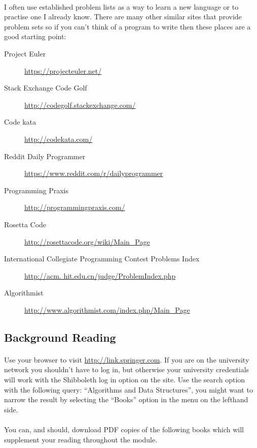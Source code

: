 \documentclass[10pt, a4paper, twosize]{article}
\begin{document}
\paragraph{} I often use established problem lists as a way to learn a new language or to practise one I already know. There are many other similar sites that provide problem sets so if you can't think of a program to write then these places are a good starting point:

\begin{description}
\item[Project Euler]\url{https://projecteuler.net/}
\item[Stack Exchange Code Golf]\url{http://codegolf.stackexchange.com/}
\item[Code kata]\url{http://codekata.com/}
\item[Reddit Daily Programmer]\url{https://www.reddit.com/r/dailyprogrammer}
\item[Programming Praxis]\url{http://programmingpraxis.com/}
\item[Rosetta Code]\url{http://rosettacode.org/wiki/Main_Page}
\item[International Collegiate Programming Contest Problems Index]\url{http://acm. hit.edu.cn/judge/ProblemIndex.php}
\item[Algorithmist]\url{http://www.algorithmist.com/index.php/Main_Page}
\end{description}


\subsection{Background Reading}

\paragraph{} Use your browser to visit \url{http://link.springer.com}. If you are on the university network you shouldn't have to log in, but otherwise your university credentials will work with the Shibboleth log in option on the site. Use the search option with the following query: ``Algorithms and Data Structures'', you might want to narrow the result by selecting the ``Books'' option in the menu on the lefthand side.

\paragraph{} You can, and should, download PDF copies of the following books which will supplement your reading throughout the module.
\end{document}

